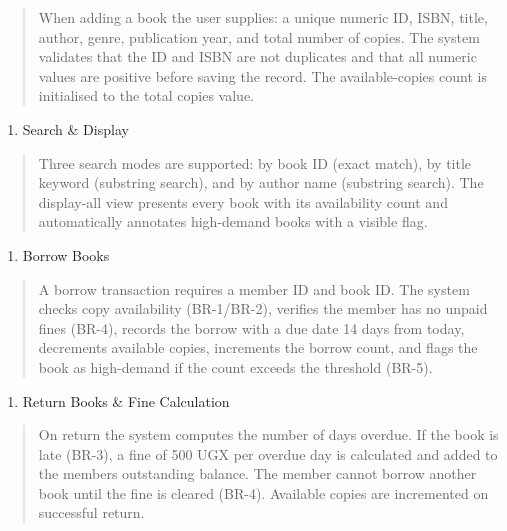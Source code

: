 \documentclass[
]{article}
\begin{document}
\begin{quote}
When adding a book the user supplies: a unique numeric ID, ISBN, title,
author, genre, publication year, and total number of copies. The system
validates that the ID and ISBN are not duplicates and that all numeric
values are positive before saving the record. The available-copies count
is initialised to the total copies value.
\end{quote}

\begin{enumerate}
\def\labelenumi{\alph{enumi})}
\setcounter{enumi}{1}
\item
  Search \& Display
\end{enumerate}

\begin{quote}
Three search modes are supported: by book ID (exact match), by title
keyword (substring search), and by author name (substring search). The
display-all view presents every book with its availability count and
automatically annotates high-demand books with a visible flag.
\end{quote}

\begin{enumerate}
\def\labelenumi{\alph{enumi})}
\setcounter{enumi}{2}
\item
  Borrow Books
\end{enumerate}

\begin{quote}
A borrow transaction requires a member ID and book ID. The system checks
copy availability (BR-1/BR-2), verifies the member has no unpaid fines
(BR-4), records the borrow with a due date 14 days from today,
decrements available copies, increments the borrow count, and flags the
book as high-demand if the count exceeds the threshold (BR-5).
\end{quote}

\begin{enumerate}
\def\labelenumi{\alph{enumi})}
\setcounter{enumi}{3}
\item
  Return Books \& Fine Calculation
\end{enumerate}

\begin{quote}
On return the system computes the number of days overdue. If the book is
late (BR-3), a fine of 500 UGX per overdue day is calculated and added
to the member\textquotesingle s outstanding balance. The member cannot
borrow another book until the fine is cleared (BR-4). Available copies
are incremented on successful return.
\end{quote}
\end{document}
